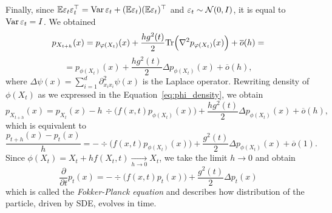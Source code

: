 Finally, since $\mathbb{E} \varepsilon_t \varepsilon_t^\top = \mathrm{Var} \,\varepsilon_t + (\mathbb{E} \varepsilon_t )(\mathbb{E} \varepsilon_t)^\top$ and $\varepsilon_t \sim \mathcal{N}(0, I)$, it is equal to $\mathrm{Var} \, \varepsilon_t = I$. We obtained
\[
    p_{X_{t + h}}(x) = p_{\varphi(X_t)}(x) + \frac{h g^2(t)}{2} \mathrm{Tr}\Big(\nabla^2 p_{\varphi(X_t)}(x)\Big) + \overline{o}(h) =
\]
\[
    = p_{\phi(X_t)}(x) + \frac{h g^2(t)}{2} \Delta p_{\phi(X_t)}(x) + \overline{o}(h),
\]
where $\Delta \psi(x) = \sum_{i = 1}^{d} \partial^2_{x_i x_i} \psi(x)$ is the Laplace operator. Rewriting density of $\phi(X_t)$ as we expressed in the Equation~\ref{eq:phi_density}, we obtain
\[
    p_{X_{t + h}}(x) = p_{X_t}(x) - h \, \div\Big(f(x, t) p_{\phi(X_t)}(x)\Big) + \frac{h g^2(t)}{2} \Delta p_{\phi(X_t)}(x) +  \overline{o}(h),
\]
which is equivalent to
\[
    \frac{p_{t + h}(x) - p_{t}(x)}{h} = -\div \Big(f(x, t) p_{\phi(X_t)}(x) \Big) + \frac{g^2(t)}{2} \Delta p_{\phi(X_t)}(x) + \overline{o}(1).
\]
Since $\phi(X_t) = X_t + h f(X_t, t) \xrightarrow[h \rightarrow 0]{} X_t$, we take the limit $h \rightarrow 0$ and obtain
\begin{equation}\label{eq:fokker_planck}
    \boxed{\frac{\partial}{\partial t} p_t(x) = -\div \Big(f(x, t) p_{t}(x)\Big) + \frac{g^2(t)}{2} \Delta p_t(x)}
\end{equation}
which is called the \emph{Fokker-Planck equation} and describes how distribution of the particle, driven by SDE, evolves in time.




